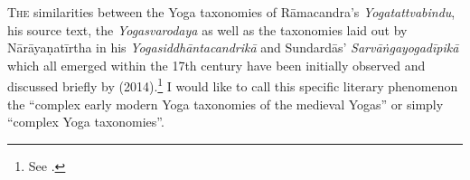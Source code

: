 




\noindent
\lettrine[lines=2, lhang=0.2, loversize=0.25]{T}{he} similarities between the Yoga taxonomies of Rāmacandra's \textit{Yogatattvabindu}, his source text, the \textit{Yogasvarodaya} as well as the taxonomies laid out by Nārāyaṇatīrtha in his \textit{Yogasiddhāntacandrikā} and Sundardās' \textit{Sarvāṅgayogadīpikā} which all emerged within the 17th century have been initially observed and discussed briefly by \citeauthor{birch2014} (2014).\footnote{See \citeauthor[2014: 415-416]{birch2014}.} I would like to call this specific literary phenomenon the ``complex early modern Yoga taxonomies of the medieval Yogas'' or simply ``complex Yoga taxonomies''.

